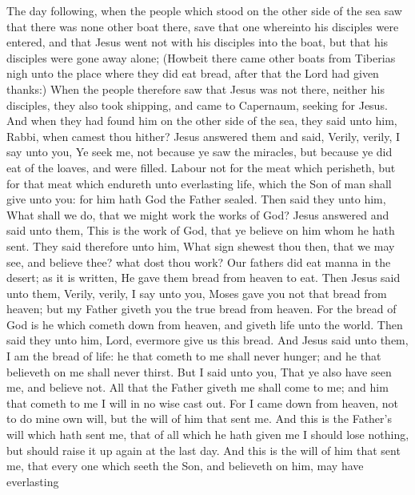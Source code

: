  The day following, when the people which stood on the
other side of the sea saw that there was none other boat there, save
that one whereinto his disciples were entered, and that Jesus went not
with his disciples into the boat, but that his disciples were gone away
alone;  (Howbeit there came other boats from Tiberias nigh
unto the place where they did eat bread, after that the Lord had given
thanks:)  When the people therefore saw that Jesus was not
there, neither his disciples, they also took shipping, and came to
Capernaum, seeking for Jesus.  And when they had found him
on the other side of the sea, they said unto him, Rabbi, when camest
thou hither?  Jesus answered them and said, Verily, verily,
I say unto you, Ye seek me, not because ye saw the miracles, but because
ye did eat of the loaves, and were filled.  Labour not for
the meat which perisheth, but for that meat which endureth unto
everlasting life, which the Son of man shall give unto you: for him hath
God the Father sealed.  Then said they unto him, What shall
we do, that we might work the works of God?  Jesus answered
and said unto them, This is the work of God, that ye believe on him whom
he hath sent.  They said therefore unto him, What sign
shewest thou then, that we may see, and believe thee? what dost thou
work?  Our fathers did eat manna in the desert; as it is
written, He gave them bread from heaven to eat.  Then Jesus
said unto them, Verily, verily, I say unto you, Moses gave you not that
bread from heaven; but my Father giveth you the true bread from heaven.
 For the bread of God is he which cometh down from heaven,
and giveth life unto the world.  Then said they unto him,
Lord, evermore give us this bread.  And Jesus said unto
them, I am the bread of life: he that cometh to me shall never hunger;
and he that believeth on me shall never thirst.  But I said
unto you, That ye also have seen me, and believe not.  All
that the Father giveth me shall come to me; and him that cometh to me I
will in no wise cast out.  For I came down from heaven, not
to do mine own will, but the will of him that sent me.  And
this is the Father's will which hath sent me, that of all which he hath
given me I should lose nothing, but should raise it up again at the last
day.  And this is the will of him that sent me, that every
one which seeth the Son, and believeth on him, may have everlasting
